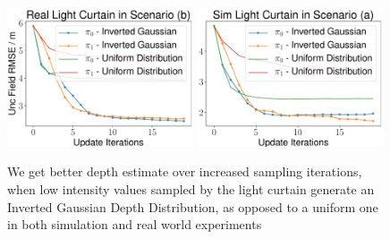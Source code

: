 \begin{figure}[h]
    \centering
    \begin{minipage}{0.5\textwidth}
        \centering
        \includegraphics[width=0.49\textwidth]{figures/Figure_0.pdf}
        \includegraphics[width=0.49\textwidth]{figures/Figure_1.pdf}
    \end{minipage}\hfill
    \centering
    \caption{We get better depth estimate over increased sampling iterations, when low intensity values sampled by the light curtain generate an Inverted Gaussian Depth Distribution, as opposed to a uniform one in both simulation and real world experiments}
    \label{fig:figure01}
\end{figure}

